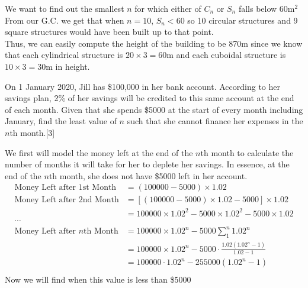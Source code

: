 \documentclass[12pt, a4 paper]{article}
\begin{document}
\begin{outline}[enumerate]
\begin{answer}
   We want to find out the smallest \(n\) for which either of \(C_n\) or \(S_n\) falls below 60m\(^2\) From our G.C. we get that when \(n=10\), \(S_n < 60\) so 10 circular structures and 9 square structures would have been built up to that point. \\

   Thus, we can easily compute the height of the building to be 870m since we know that each cylindrical structure is \(20\times3=60\)m and each cuboidal structure is \(10\times3=30\)m in height.
 \end{answer}

 \1 On 1 January 2020, Jill has \$100,000 in her bank account. According to her savings plan, 2\% of her savings will be credited to this same account at the end of each month. %
 \2 Given that she spends \$5000 at the start of every month including January, find the least value of \(n\) such that she cannot finance her expenses in the \(n\)th month.\hfill[3]
 \begin{answer}
  We first will model the money left at the end of the \(n\)th month to calculate the number of months it will take for her to deplete her savings. In essence, at the end of the \(n\)th month, she does not have \$5000 left in her account.
  \begin{align*}
   \textrm{Money Left after 1st Month}     & =(100000 - 5000)\times1.02                                          \\
   \textrm{Money Left after 2nd Month}     & = [(100000-5000)\times1.02-5000]\times1.02                          \\
                                           & = 100000 \times 1.02^2 - 5000 \times 1.02^2 - 5000\times1.02        \\
   \cdots                                                                                                        \\
   \textrm{Money Left after \(n\)th Month} & = 100000 \times 1.02^n - 5000\sum_1^n{1.02^n}                       \\
                                           & = 100000 \times 1.02^n - 5000 \cdot \frac{1.02(1.02^{n}-1)}{1.02-1} \\
                                           & = 100000 \cdot 1.02^n - 255000(1.02^{n}-1)                          \\
  \end{align*}
  Now we will find when this value is less than \$5000
  \begin{align*}

\end{align*}
\end{answer}
\end{outline}
\end{document}
